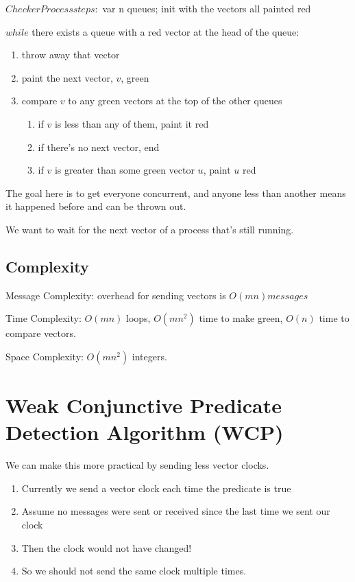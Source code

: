 \documentclass[twoside]{article}
\begin{document}
$Checker Process steps:$
var n queues; init with the vectors all painted red

$while$ there exists a queue with a red vector at the head of the queue:
    \begin{enumerate}
        \item throw away that vector
        \item paint the next vector, $v$, green
        \item compare $v$ to any green vectors at the top of the other queues
            \begin{enumerate}
                 \item if $v$ is less than any of them, paint it red
                   \item if there's no next vector, end
                   \item if $v$ is greater than some green vector $u$, paint $u$ red
        \end{enumerate}
    \end{enumerate}

The goal here is to get everyone concurrent, and anyone less than another means it happened before and can be thrown out.

We want to wait for the next vector of a process that's still running.

\subsection{Complexity}

Message Complexity: overhead for sending vectors is $O(m n) messages$

Time Complexity: $O(m n)$ loops, $O(mn^2)$ time to make green, $O(n)$ time to compare vectors.

Space Complexity: $O(mn^2)$ integers.

\section{Weak Conjunctive Predicate Detection Algorithm (WCP)}

We can make this more practical by sending less vector clocks.

\begin{enumerate}
    \item Currently we send a vector clock each time the predicate is true
    \item Assume no messages were sent or received since the last time we sent our clock
    \item Then the clock would not have changed!
    \item So we should not send the same clock multiple times.
\end{enumerate}
\end{document}
